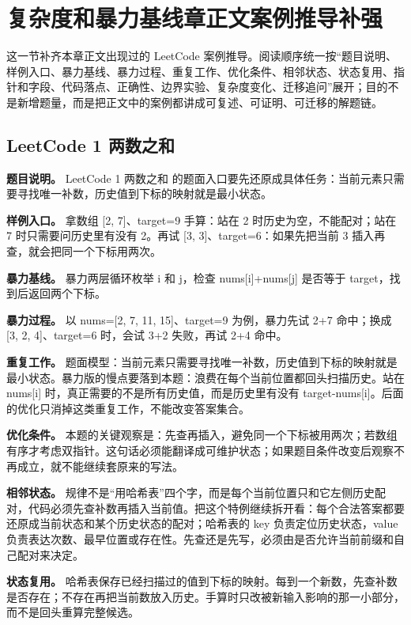\section{复杂度和暴力基线章正文案例推导补强}

这一节补齐本章正文出现过的 LeetCode 案例推导。阅读顺序统一按“题目说明、样例入口、暴力基线、暴力过程、重复工作、优化条件、相邻状态、状态复用、指针和字段、代码落点、正确性、边界实验、复杂度变化、迁移追问”展开；目的不是新增题量，而是把正文中的案例都讲成可复述、可证明、可迁移的解题链。

\subsection{LeetCode 1 两数之和}

\textbf{题目说明。} LeetCode 1 两数之和 的题面入口要先还原成具体任务：当前元素只需要寻找唯一补数，历史值到下标的映射就是最小状态。

\textbf{样例入口。} 拿数组 [2, 7]、target=9 手算：站在 2 时历史为空，不能配对；站在 7 时只需要问历史里有没有 2。再试 [3, 3]、target=6：如果先把当前 3 插入再查，就会把同一个下标用两次。

\textbf{暴力基线。} 暴力两层循环枚举 i 和 j，检查 nums[i]+nums[j] 是否等于 target，找到后返回两个下标。

\textbf{暴力过程。} 以 nums=[2, 7, 11, 15]、target=9 为例，暴力先试 2+7 命中；换成 [3, 2, 4]、target=6 时，会试 3+2 失败，再试 2+4 命中。

\textbf{重复工作。} 题面模型：当前元素只需要寻找唯一补数，历史值到下标的映射就是最小状态。暴力版的慢点要落到本题：浪费在每个当前位置都回头扫描历史。站在 nums[i] 时，真正需要的不是所有历史值，而是历史里有没有 target-nums[i]。后面的优化只消掉这类重复工作，不能改变答案集合。

\textbf{优化条件。} 本题的关键观察是：先查再插入，避免同一个下标被用两次；若数组有序才考虑双指针。这句话必须能翻译成可维护状态；如果题目条件改变后观察不再成立，就不能继续套原来的写法。

\textbf{相邻状态。} 规律不是“用哈希表”四个字，而是每个当前位置只和它左侧历史配对，代码必须先查补数再插入当前值。把这个特例继续拆开看：每个合法答案都要还原成当前状态和某个历史状态的配对；哈希表的 key 负责定位历史状态，value 负责表达次数、最早位置或存在性。先查还是先写，必须由是否允许当前前缀和自己配对来决定。

\textbf{状态复用。} 哈希表保存已经扫描过的值到下标的映射。每到一个新数，先查补数是否存在；不存在再把当前数放入历史。手算时只改被新输入影响的那一小部分，而不是回头重算完整候选。

